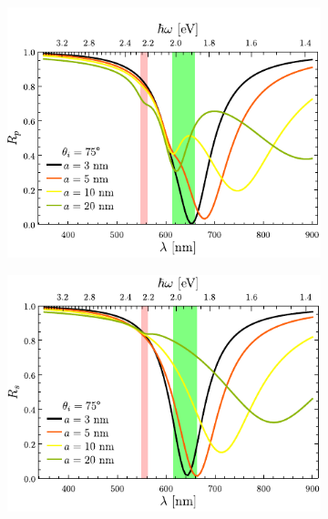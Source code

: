\begin{figure}[h!]\centering\hspace*{-1.5em}
	\begin{subfigure}{.01\linewidth}\caption{}\label{sfig:R-RVar-cutp}\vspace{4.5cm}\end{subfigure}
	\begin{subfigure}{.45\linewidth}\hspace*{-1.5em}
	\includegraphics[scale=1]{2-Resultados/figs/3-Wp4rVar/cut_angle_75_p.pdf}\end{subfigure}
	\begin{subfigure}{.01\linewidth}\caption{}\label{sfig:R-RVar-cuts}\vspace{4.5cm}\end{subfigure}\hspace*{-1.em}
	\begin{subfigure}{.45\linewidth}\centering
	\includegraphics[scale=1 ]{2-Resultados/figs/3-Wp4rVar/cut_angle_75_s.pdf}\end{subfigure}\vspace*{-.5em}

\end{figure}
